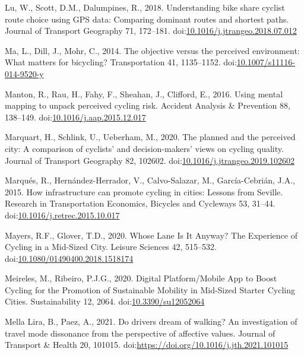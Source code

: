 \documentclass[]{elsarticle} %
\begin{document}
\leavevmode\hypertarget{ref-luUnderstandingBikeShare2018}{}%
Lu, W., Scott, D.M., Dalumpines, R., 2018. Understanding bike share
cyclist route choice using GPS data: Comparing dominant routes and
shortest paths. Journal of Transport Geography 71, 172--181.
doi:\href{https://doi.org/10.1016/j.jtrangeo.2018.07.012}{10.1016/j.jtrangeo.2018.07.012}

\leavevmode\hypertarget{ref-maObjectivePerceivedEnvironment2014}{}%
Ma, L., Dill, J., Mohr, C., 2014. The objective versus the perceived
environment: What matters for bicycling? Transportation 41, 1135--1152.
doi:\href{https://doi.org/10.1007/s11116-014-9520-y}{10.1007/s11116-014-9520-y}

\leavevmode\hypertarget{ref-mantonUsingMentalMapping2016}{}%
Manton, R., Rau, H., Fahy, F., Sheahan, J., Clifford, E., 2016. Using
mental mapping to unpack perceived cycling risk. Accident Analysis \&
Prevention 88, 138--149.
doi:\href{https://doi.org/10.1016/j.aap.2015.12.017}{10.1016/j.aap.2015.12.017}

\leavevmode\hypertarget{ref-marquartPlannedPerceivedCity2020}{}%
Marquart, H., Schlink, U., Ueberham, M., 2020. The planned and the
perceived city: A comparison of cyclists' and decision-makers' views on
cycling quality. Journal of Transport Geography 82, 102602.
doi:\href{https://doi.org/10.1016/j.jtrangeo.2019.102602}{10.1016/j.jtrangeo.2019.102602}

\leavevmode\hypertarget{ref-marquesHowInfrastructureCan2015a}{}%
Marqués, R., Hernández-Herrador, V., Calvo-Salazar, M., García-Cebrián,
J.A., 2015. How infrastructure can promote cycling in cities: Lessons
from Seville. Research in Transportation Economics, Bicycles and
Cycleways 53, 31--44.
doi:\href{https://doi.org/10.1016/j.retrec.2015.10.017}{10.1016/j.retrec.2015.10.017}

\leavevmode\hypertarget{ref-mayersWhoseLaneIt2020}{}%
Mayers, R.F., Glover, T.D., 2020. Whose Lane Is It Anyway? The
Experience of Cycling in a Mid-Sized City. Leisure Sciences 42,
515--532.
doi:\href{https://doi.org/10.1080/01490400.2018.1518174}{10.1080/01490400.2018.1518174}

\leavevmode\hypertarget{ref-meirelesDigitalPlatformMobile2020}{}%
Meireles, M., Ribeiro, P.J.G., 2020. Digital Platform/Mobile App to
Boost Cycling for the Promotion of Sustainable Mobility in Mid-Sized
Starter Cycling Cities. Sustainability 12, 2064.
doi:\href{https://doi.org/10.3390/su12052064}{10.3390/su12052064}

\leavevmode\hypertarget{ref-mellaDoDrivers2021}{}%
Mella Lira, B., Paez, A., 2021. Do drivers dream of walking? An
investigation of travel mode dissonance from the perspective of
affective values. Journal of Transport \& Health 20, 101015.
doi:\href{https://doi.org/https://doi.org/10.1016/j.jth.2021.101015}{https://doi.org/10.1016/j.jth.2021.101015}
\end{document}

